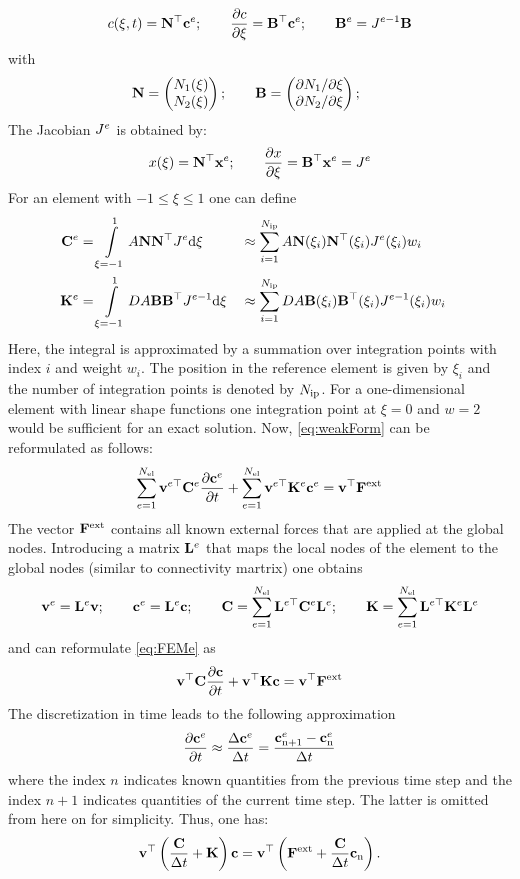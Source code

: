   \begin{equation}
    c(\xi,t) = {\bf{N}}^{\top} {\bf{c}}^e; \qquad \frac{\partial c}{\partial \xi} = {\bf{B}}^{\top} {\bf{c}}^e; \qquad {\bf{B}}^e = J^{e-1} {\bf{B}}
  \end{equation}
  with
  \begin{equation}
    {\bf{N}} = \begin{pmatrix} N_1(\xi) \\ N_2(\xi) \end{pmatrix}; \qquad 
    {\bf{B}} = \begin{pmatrix} \partial N_1 / \partial \xi \\ \partial N_2 /\partial \xi \end{pmatrix}; \qquad 
  \end{equation}
  The Jacobian $J^{e}$ is obtained by:
  \begin{equation}
    x(\xi) = {\bf{N}}^{\top}{\bf{x}}^e ; \qquad \frac{\partial x}{\partial \xi} = {\bf{B}}^{\top} {\bf{x}}^e = J^{e} 
  \end{equation}
  For an element with $-1\le\xi\le 1$ one can define
  \begin{align}
    {\bf{C}}^e &= \int\displaylimits_{\xi=-1}^{1} A {\bf{N}} {\bf{N}}^{\top} J^{e} {\rm d} \xi&&\approx \sum_{i=1}^{N_{\rm ip}} A {\bf{N}}(\xi_i) {\bf{N}}^{\top}(\xi_i) J^{e}(\xi_i) w_i&& \\
    {\bf{K}}^e &= \int\displaylimits_{\xi=-1}^{1} D A {\bf{B}} {\bf{B}}^{\top} J^{e-1} {\rm d} \xi&&\approx \sum_{i=1}^{N_{\rm ip}} D A {\bf{B}}(\xi_i) {\bf{B}}^{\top}(\xi_i) J^{e-1}(\xi_i) w_i&&
  \end{align}
  Here, the integral is approximated by a summation over integration points with index $i$ and weight $w_i$. The position in the reference element is given by $\xi_i$ and the number of integration points is denoted by $N_{\rm ip}$. For a one-dimensional element with linear shape functions one integration point at $\xi=0$ and $w=2$ would be sufficient for an exact solution. Now, \cref{eq:weakForm} can be reformulated as follows:
  \begin{equation}
     \sum_{e=1}^{N_{\rm el}} {{\bf{v}}}^{e \top} {\bf{C}}^e \frac{\partial {\bf{c}}^e}{\partial t} + \sum_{e=1}^{N_{\rm el}} {{\bf{v}}}^{e \top} {\bf{K}}^e {\bf{c}}^e = {\bf{v}}^{\top} {\bf{F}}^{\rm ext} \label{eq:FEMe}
  \end{equation}
  The vector ${\bf{F}}^{\rm ext}$ contains all known external forces that are applied at the global nodes. Introducing a matrix ${\bf{L}}^{e}$ that maps the local nodes of the element to the global nodes (similar to connectivity martrix) one obtains 
  \begin{equation}
    {\bf{v}}^e = {\bf{L}}^{e} {\bf{v}}; \qquad {\bf{c}}^e = {\bf{L}}^{e} {\bf{c}}; \qquad {\bf{C}} = \sum_{e=1}^{N_{\rm el}} {{\bf{L}}}^{e \top} {\bf{C}}^e {\bf{L}}^{e}; \qquad {\bf{K}} = \sum_{e=1}^{N_{\rm el}} {{\bf{L}}}^{e \top} {\bf{K}}^e {\bf{L}}^{e}
  \end{equation}
  and can reformulate \cref{eq:FEMe} as 
  \begin{equation}
    {\bf{v}}^{\top} {\bf{C}} \frac{\partial {\bf{c}}}{\partial t} + {\bf{v}}^{\top} {\bf{K}} {\bf{c}} = {\bf{v}}^{\top} {\bf{F}}^{\rm ext} \label{eq:FEM}
  \end{equation}
  The discretization in time leads to the following approximation
  \begin{equation}
    \frac{\partial {\bf{c}}^e}{\partial t} \approx \frac{\Delta {\bf{c}}^e}{\Delta t}  = \frac{{\bf{c}}^e_{\rm n+1}-{\bf{c}}^e_{\rm n}}{\Delta t}
  \end{equation}
  where the index $n$ indicates known quantities from the previous time step and the index $n+1$ indicates quantities of the current time step. The latter is omitted from here on for simplicity.
  Thus, one has: 
  \begin{equation}
    {\bf{v}}^{\top} \left( \frac{{\bf{C}}}{\Delta t}+ {\bf{K}} \right) {\bf{c}} = {\bf{v}}^{\top} \left({\bf{F}}^{\rm ext} + \frac{{\bf{C}}}{\Delta t} {\bf{c}}_{\rm n}\right).
  \end{equation}

